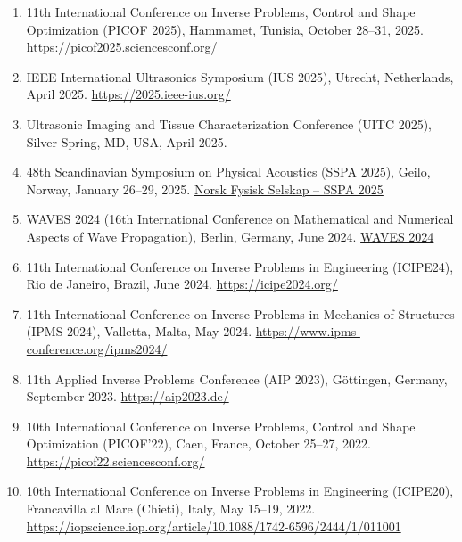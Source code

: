 \documentclass[10pt]{article} %
\begin{document}
\begin{enumerate}
  \item 11th International Conference on Inverse Problems, Control and Shape Optimization (PICOF 2025),  
  Hammamet, Tunisia, October 28–31, 2025.  
  \href{https://picof2025.sciencesconf.org/}{https://picof2025.sciencesconf.org/}

  \item IEEE International Ultrasonics Symposium (IUS 2025),  
  Utrecht, Netherlands, April 2025.  
  \href{https://2025.ieee-ius.org/}{https://2025.ieee-ius.org/}

  \item Ultrasonic Imaging and Tissue Characterization Conference (UITC 2025),  
  Silver Spring, MD, USA, April 2025.  

  \item 48th Scandinavian Symposium on Physical Acoustics (SSPA 2025),  
  Geilo, Norway, January 26–29, 2025. 
  \href{https://www.norskfysisk.no/faggrupper/faggruppe-akustikk/sspa/}{Norsk Fysisk Selskap – SSPA 2025}

  \item WAVES 2024 (16th International Conference on Mathematical and Numerical Aspects of Wave Propagation),  
      Berlin, Germany, June 2024.  
      \href{https://waves2024.mps.mpg.de/}{WAVES 2024}


  \item 11th International Conference on Inverse Problems in Engineering (ICIPE24),  
  Rio de Janeiro, Brazil, June 2024.  
  \href{https://icipe2024.org/}{https://icipe2024.org/}

  \item 11th International Conference on Inverse Problems in Mechanics of Structures (IPMS 2024),  
  Valletta, Malta, May 2024.  
  \href{https://www.ipms-conference.org/ipms2024/}{https://www.ipms-conference.org/ipms2024/}

  \item 11th Applied Inverse Problems Conference (AIP 2023),  
  Göttingen, Germany, September 2023.  
  \href{https://aip2023.de/}{https://aip2023.de/}

  \item 10th International Conference on Inverse Problems, Control and Shape Optimization (PICOF'22),  
  Caen, France, October 25–27, 2022.  
  \href{https://picof22.sciencesconf.org/}{https://picof22.sciencesconf.org/}

  \item 10th International Conference on Inverse Problems in Engineering (ICIPE20),  
  Francavilla al Mare (Chieti), Italy, May 15–19, 2022.  
  \href{https://iopscience.iop.org/article/10.1088/1742-6596/2444/1/011001}{https://iopscience.iop.org/article/10.1088/1742-6596/2444/1/011001}  
\end{enumerate}
\end{document}
